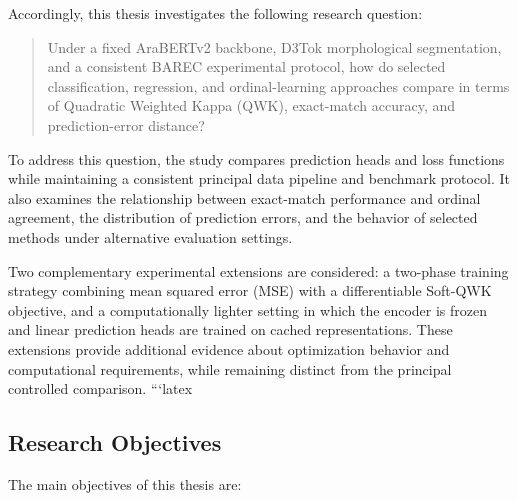 \documentclass[12pt]{report}
\begin{document}
Accordingly, this thesis investigates the following research question:

\begin{quote}
Under a fixed AraBERTv2 backbone, D3Tok morphological segmentation, and a consistent BAREC experimental protocol, how do selected classification, regression, and ordinal-learning approaches compare in terms of Quadratic Weighted Kappa (QWK), exact-match accuracy, and prediction-error distance?
\end{quote}

To address this question, the study compares prediction heads and loss functions while maintaining a consistent principal data pipeline and benchmark protocol. It also examines the relationship between exact-match performance and ordinal agreement, the distribution of prediction errors, and the behavior of selected methods under alternative evaluation settings.

Two complementary experimental extensions are considered: a two-phase training strategy combining mean squared error (MSE) with a differentiable Soft-QWK objective, and a computationally lighter setting in which the encoder is frozen and linear prediction heads are trained on cached representations. These extensions provide additional evidence about optimization behavior and computational requirements, while remaining distinct from the principal controlled comparison.
```latex
\subsection{Research Objectives}
\label{sec:research-objectives}

The main objectives of this thesis are:
\end{document}
